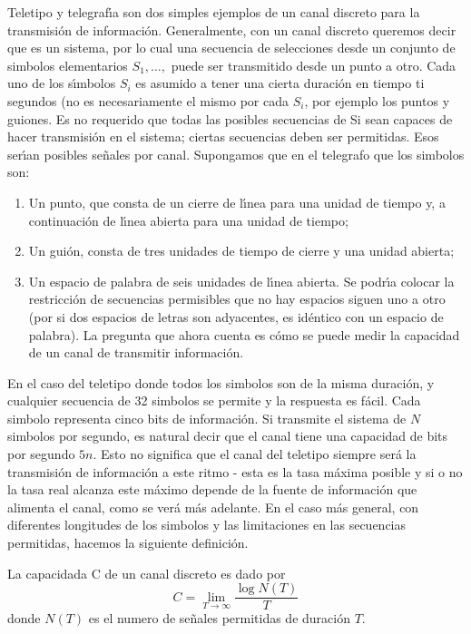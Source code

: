 Teletipo y telegraf\'{\i}a son dos simples ejemplos de un canal
discreto para la transmisi\'{o}n de informaci\'{o}n. Generalmente, con
un canal discreto queremos decir que es un sistema, por lo cual una
secuencia de selecciones desde un conjunto de simbolos elementarios
$S_1,\ldots,$ puede ser transmitido desde un punto a otro. Cada uno de
los s\'{\i}mbolos $S_i$ es asumido a tener una cierta duraci\'{o}n en
tiempo ti segundos (no es necesariamente el mismo por cada $S_i$, por
ejemplo los puntos y guiones. Es no requerido que todas las posibles
secuencias de Si sean capaces de hacer transmisi\'{o}n en el sistema;
ciertas secuencias deben ser permitidas. Esos ser\'{\i}an posibles
se\~{n}ales por canal. Supongamos que en el telegrafo que los simbolos
son: 
\begin{enumerate}
\item{Un punto, que consta de un cierre de l\'{\i}nea para una
unidad de tiempo y, a continuaci\'{o}n de l\'{\i}nea abierta para una
unidad de tiempo;}
\item{Un gui\'{o}n, consta de tres unidades de tiempo
de cierre y una unidad abierta;}
\item{Un espacio de palabra de seis
unidades de l\'{\i}nea abierta. Se podr\'{\i}a colocar la
restricci\'{o}n de secuencias permisibles que no hay espacios siguen
uno a otro (por si dos espacios de letras son adyacentes, es
id\'{e}ntico con un espacio de palabra). La pregunta que ahora cuenta
es c\'{o}mo se puede medir la capacidad de un canal de transmitir
informaci\'{o}n.}
\end{enumerate}

En el caso del teletipo donde todos los simbolos son de la misma
duraci\'{o}n, y cualquier secuencia de 32 simbolos se permite y la
respuesta es f\'{a}cil. Cada simbolo representa cinco bits de
informaci\'{o}n. Si transmite el sistema de $N$ simbolos por segundo,
es natural decir que el canal tiene una capacidad de bits por segundo
$5 n$. Esto no significa que el canal del teletipo siempre ser\'{a} la
transmisi\'{o}n de informaci\'{o}n a este ritmo - esta es la tasa
m\'{a}xima posible y si o no la tasa real alcanza este m\'{a}ximo
depende de la fuente de informaci\'{o}n que alimenta el canal, como se
ver\'{a} m\'{a}s adelante. En el caso m\'{a}s general, con diferentes
longitudes de los simbolos y las limitaciones en las secuencias
permitidas, hacemos la siguiente definici\'{o}n.

\begin{definition}
La capacidada C de un canal discreto es dado por
\begin{equation}
C = \lim_{T \rightarrow \infty} \frac{\log N(T)}{T}
\end{equation}
donde $N(T)$ es el numero de se\~{n}ales permitidas de duraci\'{o}n $T$.
\end{definition}

